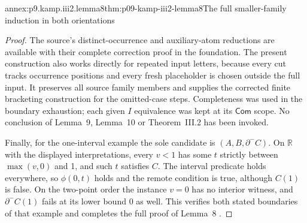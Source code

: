 \begin{annexitem}{annex:p9.kamp.iii2.lemma8}{thm:p09-kamp-iii2-lemma8}{The full smaller-family induction in both orientations}
\begin{proof}
The source's distinct-occurrence and auxiliary-atom reductions are
available with their complete correction proof in the foundation.
The present construction also works directly for repeated input
letters, because every cut tracks occurrence positions and every
fresh placeholder is chosen outside the full input. It preserves
all source family members and supplies the corrected finite bracketing
construction for the omitted-case steps. Completeness was used
in the boundary exhaustion; each given \(I\) equivalence was
kept at its \(\mathsf{Com}\) scope. No conclusion of Lemma~9,
Lemma~10 or Theorem~III.2 has been invoked.

Finally, for the one-interval example the sole candidate is
\((A,B,\partial^-C)\). On \(\mathbb R\) with the displayed
interpretations, every \(v<1\) has some \(t\) strictly
between \(\max(v,0)\) and 1, and such \(t\) satisfies
\(C\). The interval predicate holds everywhere, so
\(\phi(0,t)\) holds and the remote condition is true,
although \(C(1)\) is false. On the two-point order the
instance \(v=0\) has no interior witness, and
\(\partial^-C(1)\) fails at its lower bound 0 as well.
This verifies both stated boundaries of that example and completes
the full proof of Lemma~8 \cite[ch.~III, pp.~83--92]{Kamp1968}.
\end{proof}
\end{annexitem}

